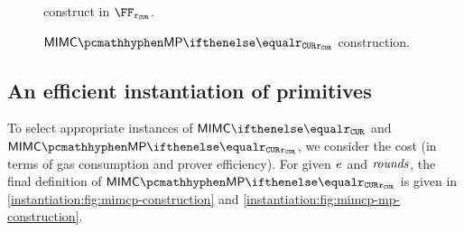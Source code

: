 \begin{figure*}[ht]
    \begin{minipage}[t]{0.50\textwidth}
        \caption{\MP{} construct in $\FFx{\rCURVE}$.}\label{instantiation:fig:mp-constructions}
    \end{minipage}%
    \begin{minipage}[t]{0.50\textwidth}
    \caption{$\mimcMPPrime{\rCURVE}$ construction.}\label{instantiation:fig:mimc-mp-constructions}
    \end{minipage}%
\end{figure*}

\subsection{An efficient instantiation of \mimc{} primitives}\label{instantiation:mkhash:efficient-instance}

To select appropriate instances of $\mimcPrime{\rCURVE}$ and $\mimcMPPrime{\rCURVE}$, we consider the cost (in terms of gas consumption and prover efficiency). For given $\mathit{e}{}$ and $\mathit{rounds}{}$, the final definition of $\mimcMPPrime{\rCURVE}$ is given in \cref{instantiation:fig:mimcp-construction} and \cref{instantiation:fig:mimcp-mp-construction}.

\newcommand{\initRoundConstants}{\algostyle{InitRoundConstants}}

